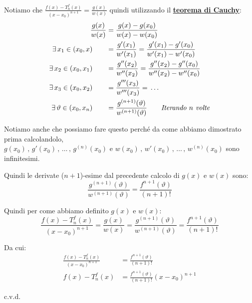 \documentclass[../../dimostrazioni]{subfiles}
\begin{document}
            Notiamo che \(  \frac{f(x) - T _n ^ f (x)}{(x-x_0)^{n+1}} = \frac{g(x)}{w(x)}    \) quindi utilizzando il \textbf{\hyperref[teoCauchy]{teorema di Cauchy}}:
            \begin{align*}
                \frac{g(x)}{w(x)} &= \frac{g(x) - g(x_0)}{w(x) - w(x_0)}\\
                \exists \, x_1 \in (x_0, x) \qquad &= \frac{g'(x_1)}{w'(x_1)} = \frac{g'(x_1) - g'(x_0)}{w'(x_1) - w'(x_0)}\\
                \exists \, x_2 \in (x_0, x_1) \qquad &= \frac{g''(x_2)}{w''(x_2)} = \frac{g''(x_2) - g''(x_0)}{w''(x_2) - w''(x_0)}\\
                \exists \, x_3 \in (x_0, x_2) \qquad &= \frac{g'''(x_3)}{w'''(x_3)} = \, \dots\\
                \exists \, \vartheta \in (x_0, x_n) \qquad &= \frac{g^{(n+1)}(\vartheta)}{w^{(n+1)}(\vartheta)} \qquad \text{\emph{Iterando \(n\) volte}}
            \end{align*}

            Notiamo anche che possiamo fare questo perché da come abbiamo dimostrato prima calcolandolo,\\
            \(g(x_0)\,,\, g'(x_0)\,,\, \dots\,,\, g^{(n)} (x_0) \) e \( w(x_0)\,,\, w'(x_0)\,,\, \dots\,,\, w^{(n)} (x_0)\) sono infinitesimi.\\

            \newpage
            
            Quindi le derivate (\(n+1\))-esime dal precedente calcolo di \(g(x)\) e \(w(x)\) sono:
            \[  \frac{g^{(n+1)}(\vartheta)}{w^{(n+1)}(\vartheta)} = \frac{f^{n+1}(\vartheta)}{(n+1)!} \]

            Quindi per come abbiamo definito \(g(x)\) e \(w(x)\):
            \[  \frac{f(x) - T _n ^ f (x)}{(x-x_0)^{n+1}} = \frac{g(x)}{w(x)} = \frac{g^{(n+1)}(\vartheta)}{w^{(n+1)}(\vartheta)} = \frac{f^{n+1}(\vartheta)}{(n+1)!}   \]

            Da cui:
            \begin{align*}
                \frac{f(x) - T _n ^ f (x)}{(x-x_0)^{n+1}} &= \frac{f^{n+1}(\vartheta)}{(n+1)!}\\
                f(x) - T _n ^ f (x) &= \frac{f^{n+1}(\vartheta)}{(n+1)!}(x-x_0)^{n+1}
            \end{align*}

            c.v.d.
        
\end{document}
